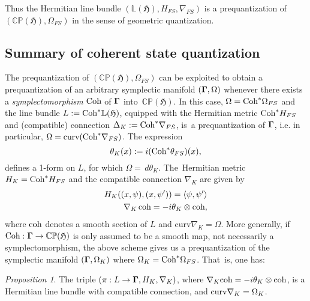 \documentclass[12pt]{amsart}
\numberwithin{equation}{section}
\theoremstyle{remark}
\newcommand\HH{\mathfrak H}
\newtheorem{prop}[defi]{Proposition}
\newcommand{\prhs}{{\mathbb C\mathbb P}( \HH)}
\newcommand{\bigam}{\mbox{\boldmath $\Gamma$}}
\begin{document}
Thus  the Hermitian line bundle $(\mathbb L(\HH), H_{FS}, \nabla_{FS})$ is a
prequantization  of $(\prhs, \Omega_{FS})$ in the sense of geometric
quantization.


\subsection{Summary of coherent state quantization}\label{sec-summcohstquant}

The prequantization of $(\prhs,\Omega_{FS})$ can be exploited to obtain a
prequantization of an arbitrary symplectic manifold $(\bigam ,\Omega)$ whenever
there exists a  {\em symplectomorphism} $\mbox{\rm Coh}$ of $\bigam$
into~$\prhs$. In this case, $\Omega = \mbox{\rm Coh}^* \Omega_{FS}$ and the
line bundle $L:= \mbox{\rm Coh}^*\mathbb L(\HH)$, equipped with the
Hermitian metric $\mbox{\rm Coh}^*H_{FS}$ and (compatible) connection
$\Delta_K:= \mbox{\rm Coh}^*\nabla_{FS}$, is~a prequantization of $\bigam$,
i.e. in particular, $\Omega = \mbox{curv}
(\mbox{\rm Coh}^*\nabla_{FS})$. The expression
\begin{equation}  \theta_K(x):= i(\mbox{\rm Coh}^{*}\theta_{FS})(x),
\end{equation}
defines a 1-form on $L$, for which $\Omega = \,d \theta_K$.
The~Hermitian metric $H_K = \mbox{\rm Coh}^* H_{FS}$ and the compatible
connection $\nabla_K$ are given by
\begin{eqnarray}
H_K((x,\psi),(x,\psi^\prime) ) = \langle \psi, \psi^\prime \rangle\\
\nabla_K\,\mbox{\rm coh} = -i\theta_K \otimes \mbox{\rm coh},
\end{eqnarray}
where $\mbox{\rm coh}$ denotes a smooth section of $L$ and $\mbox{curv}
\nabla_K = \Omega$. More generally, if $\mbox{\rm Coh}: \bigam \to \prhs$ is
only assumed to be a smooth map, not necessarily a symplectomorphism, the above
scheme gives us a prequantization of the symplectic manifold
$(\bigam,\Omega_K)$  where $\Omega_K = \mbox{\rm Coh}^*\Omega_{FS}$. That~is,
one has:

\begin{prop} \label{bundle}
The triple $ (\pi: L  \to  \bigam, H_K, \nabla _K) $,
where $\nabla _K\mbox{\rm coh}  = -i\theta_K\otimes \mbox{\rm coh}$,  is a
Hermitian line bundle with compatible connection, and $\mbox{\rm curv}
\nabla_{K} = \Omega_{K} $.  \end{prop}
\end{document}
